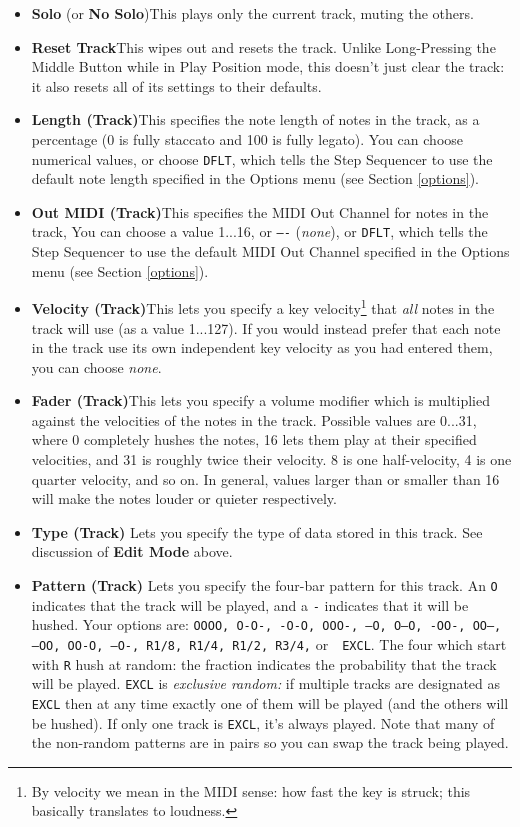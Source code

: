 \documentclass{article}
\begin{document}
\begin{itemize}
\item {\bf Solo} (or {\bf No Solo})\quad This plays only the current track, muting the others.
\item {\bf Reset Track}\quad This wipes out and resets the track.  Unlike Long-Pressing the Middle Button while in Play Position mode, this doesn't just clear the track: it also resets all of its settings to their defaults.
\item {\bf Length (Track)}\quad This specifies the note length of notes in the track, as a percentage (0 is fully staccato and 100 is fully legato).   You can choose numerical values, or choose \texttt{DFLT}, which tells the Step Sequencer to use the default note length specified in the Options menu (see Section \ref{options}).
\item {\bf Out MIDI (Track)}\quad This specifies the MIDI Out Channel for notes in the track,    You can choose a value 1...16, or \texttt{----} ({\it none}), or \texttt{DFLT}, which tells the Step Sequencer to use the default MIDI Out Channel specified in the Options menu (see Section \ref{options}).
\item {\bf Velocity (Track)}\quad This lets you specify a key velocity\footnote{By velocity we mean in the MIDI sense: how fast the key is struck; this basically translates to loudness.} that {\it all} notes in the track will use (as a value 1...127).  If you would instead prefer that each note in the track use its own independent key velocity as you had entered them, you can choose {\it none}.
\item {\bf Fader (Track)}\quad This lets you specify a volume modifier which is multiplied against the velocities of the notes in the track.  Possible values are 0...31, where 0 completely hushes the notes, 16 lets them play at their specified velocities, and 31 is roughly twice their velocity.  8 is one half-velocity, 4 is one quarter velocity, and so on.  In general, values larger than or smaller than 16 will make the notes louder or quieter respectively.
\item {\bf Type (Track)} \quad Lets you specify the type of data stored in this track.  See discussion of {\bf Edit Mode} above.
\item {\bf Pattern (Track)} \quad Lets you specify the four-bar pattern for this track.  An {\tt O} indicates that the track will be played, and a {\tt -} indicates that it will be hushed.  Your options are: \texttt{OOOO, O-O-, -O-O, OOO-, ---O, O--O, -OO-, OO--, --OO, OO-O, --O-, R1/8, R1/4, R1/2, R3/4,} or\ \ {\tt EXCL}.  The four which start with {\tt R} hush at random: the fraction indicates the probability that the track will be played.  {\tt EXCL} is {\it exclusive random:} if multiple tracks are designated as {\tt EXCL} then at any time exactly one of them will be played (and the others will be hushed).  If only one track is {\tt EXCL}, it's always played.  Note that many of the non-random patterns are in pairs so you can swap the track being played.

\end{itemize}
\end{document}

